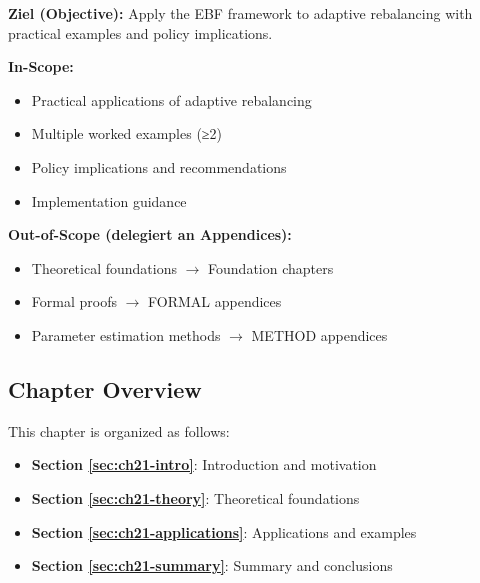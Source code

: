 \begin{tcolorbox}[
    colback=purple!5!white,
    colframe=purple!75!black,
    title={\textbf{Chapter Scope: Ziel / In-Scope / Out-of-Scope}},
    fonttitle=\bfseries
]

\textbf{Ziel (Objective):}
Apply the EBF framework to adaptive rebalancing with practical examples and policy implications.

\vspace{0.3cm}
\textbf{In-Scope:}
\begin{itemize}[nosep]
    \item Practical applications of adaptive rebalancing
    \item Multiple worked examples (≥2)
    \item Policy implications and recommendations
    \item Implementation guidance
\end{itemize}

\vspace{0.3cm}
\textbf{Out-of-Scope (delegiert an Appendices):}
\begin{itemize}[nosep]
    \item Theoretical foundations $\rightarrow$ Foundation chapters
    \item Formal proofs $\rightarrow$ FORMAL appendices
    \item Parameter estimation methods $\rightarrow$ METHOD appendices
\end{itemize}

\end{tcolorbox}



\subsection*{Chapter Overview}

This chapter is organized as follows:

\begin{itemize}
\item \textbf{Section \ref{sec:ch21-intro}}: Introduction and motivation
\item \textbf{Section \ref{sec:ch21-theory}}: Theoretical foundations
\item \textbf{Section \ref{sec:ch21-applications}}: Applications and examples
\item \textbf{Section \ref{sec:ch21-summary}}: Summary and conclusions
\end{itemize}



